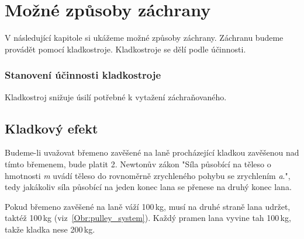 \chapter{Možné způsoby záchrany}
\label{Mozne_zpusoby_zachrany}
\def\figurename{Obr.} %
\def\tablename{Tab.} %
\def\figureautorefname{obr.} %
\def\tableautorefname{tab.} %
\def\chapterautorefname{kapitola} %

V následující kapitole si ukážeme možné způsoby záchrany. Záchranu budeme provádět pomocí kladkostroje. Kladkostroje se dělí podle účinnosti. 

\subsection*{Stanovení účinnosti kladkostroje}

Kladkostroj snižuje úsilí potřebné k vytažení záchraňovaného. 

\section{Kladkový efekt}

Budeme-li uvažovat břemeno zavěšené na laně procházející kladkou zavěšenou nad tímto břemenem, bude platit 2. Newtonův zákon "Síla působící na těleso o hmotnosti \textit{m} uvádí těleso do rovnoměrně zrychleného pohybu se zrychlením \textit{a}.", tedy jakákoliv síla působící na jeden konec lana se přenese na druhý konec lana.

Pokud břemeno zavěšené na laně váží 100\,kg, musí na druhé straně lana udržet, taktéž 100\,kg (viz~\autoref{Obr:pulley_system}). Každý pramen lana vyvine tah 100\,kg, takže kladka nese 200\,kg.

